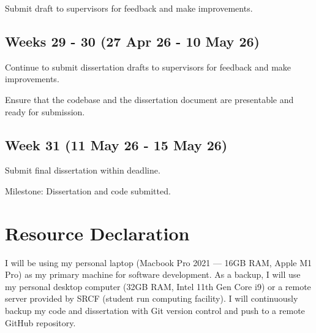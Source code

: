 \documentclass[12pt,a4paper,twoside]{article}
\begin{document}
Submit draft to supervisors for feedback and make improvements.

\subsection*{Weeks 29 - 30 (27 Apr 26 - 10 May 26)}

Continue to submit dissertation drafts to supervisors for feedback and make improvements.

Ensure that the codebase and the dissertation document are presentable and ready for submission.

\subsection*{Week 31 (11 May 26 - 15 May 26)}

Submit final dissertation within deadline.

Milestone: Dissertation and code submitted.

\section{Resource Declaration}

I will be using my personal laptop (Macbook Pro 2021 --- 16GB RAM, Apple M1 Pro) as my primary machine for software development. As a backup, I will use my personal desktop computer (32GB RAM, Intel 11th Gen Core i9) or a remote server provided by SRCF (student run computing facility). I will continuously backup my code and dissertation with Git version control and push to a remote GitHub repository.


\newpage

\printbibliography[heading=subbibliography]

\appendix
\end{document}
